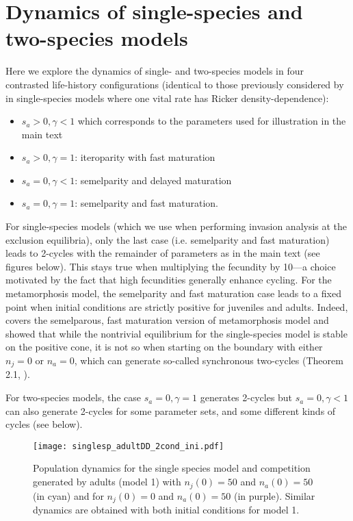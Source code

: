 \documentclass{article}
\begin{document}
\newpage

\section{Dynamics of single-species and two-species models}\label{SI:simuls_twospecies}
Here we explore the dynamics of single- and two-species models in four contrasted life-history configurations (identical to those previously considered by \citealt{neubert2000density} in single-species models where one vital rate has Ricker density-dependence):
\begin{itemize}
    \item $s_a>0, \gamma<1$ which corresponds to the parameters used for illustration in the main text
    \item $s_a>0, \gamma=1$: iteroparity with fast maturation
    \item $s_a=0, \gamma<1$: semelparity and delayed maturation
    \item $s_a=0, \gamma=1$: semelparity and fast maturation.
\end{itemize}
For single-species models (which we use when performing invasion analysis at the exclusion equilibria), only the last case (i.e. semelparity and fast maturation) leads to 2-cycles with the remainder of parameters as in the main text (see figures below). This stays true when multiplying the fecundity by 10---a choice motivated by the fact that high fecundities generally enhance cycling. For the metamorphosis model, the semelparity and fast maturation case leads to a fixed point when initial conditions are strictly positive for juveniles and adults. Indeed, \citet{cushing2007coexistence} covers the semelparous, fast maturation version of metamorphosis model and showed that while the nontrivial equilibrium for the single-species model is stable on the positive cone, it is not so when starting on the boundary with either $n_j=0$ or $n_a=0$, which can generate so-called synchronous two-cycles (Theorem 2.1, \citealt{cushing2007coexistence}).
 
For two-species models, the case $s_a=0, \gamma=1$ generates 2-cycles but $s_a=0, \gamma<1$ can also generate 2-cycles for some parameter sets, and some different kinds of cycles (see below). \\ 

\begin{figure}[H]
    \centering
    \texttt{[image: singlesp\_adultDD\_2cond\_ini.pdf]}
    \caption{Population dynamics for the single species model and competition generated by adults (model 1) with $n_{j}(0) = 50$ and $n_{a}(0) = 50$ (in cyan) and for $n_{j}(0) = 0$ and $n_{a}(0) = 50$ (in purple). Similar dynamics are obtained with both initial conditions for model 1. }
    \label{fig:1sp_dynamics}
\end{figure}
\end{document}
